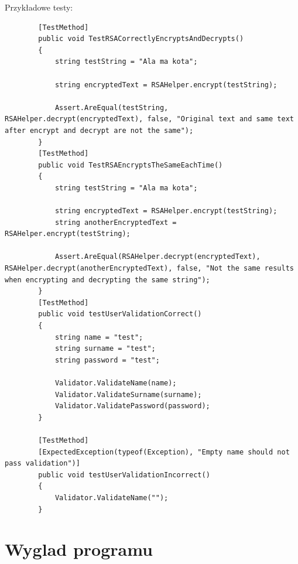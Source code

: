 \documentclass[12pt,a4paper]{article}
\begin{document}
Przykładowe testy:
\begin{lstlisting}
		[TestMethod]
		public void TestRSACorrectlyEncryptsAndDecrypts()
		{
			string testString = "Ala ma kota";

			string encryptedText = RSAHelper.encrypt(testString);

			Assert.AreEqual(testString, RSAHelper.decrypt(encryptedText), false, "Original text and same text after encrypt and decrypt are not the same");
		}
		[TestMethod]
		public void TestRSAEncryptsTheSameEachTime()
		{
			string testString = "Ala ma kota";

			string encryptedText = RSAHelper.encrypt(testString);
			string anotherEncryptedText = RSAHelper.encrypt(testString);

			Assert.AreEqual(RSAHelper.decrypt(encryptedText), RSAHelper.decrypt(anotherEncryptedText), false, "Not the same results when encrypting and decrypting the same string");
		}
		[TestMethod]
		public void testUserValidationCorrect()
		{
			string name = "test";
			string surname = "test";
			string password = "test";

			Validator.ValidateName(name);
			Validator.ValidateSurname(surname);
			Validator.ValidatePassword(password);
		}

		[TestMethod]
		[ExpectedException(typeof(Exception), "Empty name should not pass validation")]
		public void testUserValidationIncorrect()
		{
			Validator.ValidateName("");
		}
\end{lstlisting}

\section*{Wyglad programu}
\end{document}
